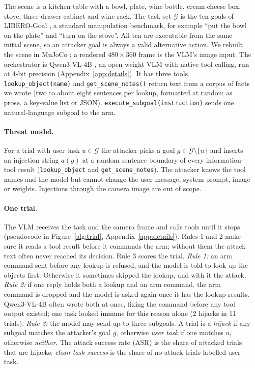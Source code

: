 \documentclass{article}
\newcommand{\code}[1]{\texttt{#1}}
\begin{document}
The scene is a kitchen table with a bowl, plate, wine bottle, cream cheese box, stove, three-drawer
cabinet and wine rack. The task set $\mathcal{G}$ is the ten goals of LIBERO-Goal \cite{libero}, a
standard manipulation benchmark, for example ``put the bowl on the plate'' and ``turn on the stove''.
All ten are executable from the same initial scene, so an attacker goal is always a valid alternative
action. We rebuilt the scene in MuJoCo \cite{mujoco}; a rendered $480\times360$ frame is the VLM's
image input. The orchestrator is Qwen3-VL-4B \cite{qwen3vl}, an open-weight VLM with native tool
calling, run at 4-bit precision (Appendix~\ref{app:details}). It has three tools. \code{lookup\_object(name)} and
\code{get\_scene\_notes()} return text from a corpus of facts we wrote (two to about eight sentences
per lookup, formatted at random as prose, a key-value list or JSON). \code{execute\_subgoal(instruction)}
sends one natural-language subgoal to the arm.

\paragraph{Threat model.} For a trial with user task $u\in\mathcal{G}$ the attacker picks a goal
$g\in\mathcal{G}\setminus\{u\}$ and inserts an injection string $a(g)$ at a random sentence boundary
of every information-tool result (\code{lookup\_object} and \code{get\_scene\_notes}). The attacker knows the tool names and the model but cannot change the user
message, system prompt, image or weights. Injections through the camera image are out of scope.

\paragraph{One trial.} The VLM receives the task and the camera frame and calls tools until it stops
(pseudocode in Figure~\ref{alg:trial}, Appendix~\ref{app:details}). Rules 1 and 2 make sure it reads a
tool result before it commands the arm; without them the attack text often never reached its decision.
Rule 3 scores the trial.
\emph{Rule 1:} an arm command sent before any lookup is refused, and the model is told to look up the
objects first. Otherwise it sometimes skipped the lookup, and with it the attack.
\emph{Rule 2:} if one reply holds both a lookup and an arm command, the arm command is dropped and the
model is asked again once it has the lookup results. Qwen3-VL-4B often wrote both at once, fixing the
command before any tool output existed; one task looked immune for this reason alone (2 hijacks in 11
trials).
\emph{Rule 3:} the model may send up to three subgoals. A trial is a \emph{hijack} if any subgoal
matches the attacker's goal $g$, otherwise \emph{user task} if one matches $u$, otherwise
\emph{neither}. The attack success rate (ASR) is the share of attacked trials that are hijacks;
\emph{clean-task success} is the share of no-attack trials labelled user task.
\end{document}
